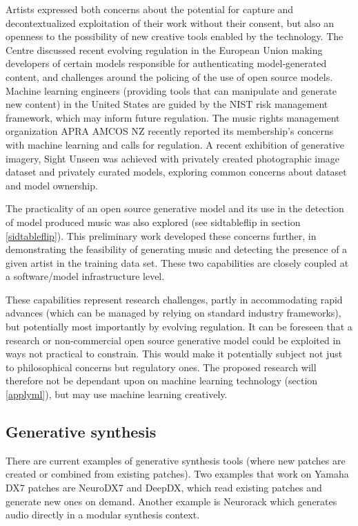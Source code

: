 \documentclass[10pt]{article}
\begin{document}
\begin{multicols*}{2}
Artists expressed both concerns about the potential for capture and decontextualized exploitation of their work without their consent\cite{datacollect}, but also an openness to the possibility of new creative tools enabled by the technology\cite{creativityai}. The Centre discussed recent evolving regulation in the European Union making developers of certain models responsible for authenticating model-generated content\cite{euairegs}, and challenges around the policing of the use of open source models. Machine learning engineers (providing tools that can manipulate and generate new content) in the United States are guided by the NIST risk management framework\cite{nistai}, which may inform future regulation. The music rights management organization APRA AMCOS NZ recently reported its membership's concerns with machine learning and calls for regulation\cite{aprastory}. A recent exhibition of generative imagery, Sight Unseen\cite{sightunseen} was achieved with privately created photographic image dataset and privately curated models, exploring common concerns about dataset and model ownership. 

The practicality of an open source generative model and its use in the detection of model produced music was also explored (see sidtableflip in section \ref{sidtableflip}). This preliminary work developed these concerns further, in demonstrating the feasibility of generating music and detecting the presence of a given artist in the training data set. These two capabilities are closely coupled at a software/model infrastructure level.

These capabilities represent research challenges, partly in accommodating rapid advances (which can be managed by relying on standard industry frameworks), but potentially most importantly by evolving regulation. It can be foreseen that a research or non-commercial open source generative model could be exploited in ways not practical to constrain. This would make it potentially subject not just to philosophical concerns but regulatory ones. The proposed research will therefore not be dependant upon on machine learning technology (section \ref{applyml}), but may use machine learning creatively.

\subsection{Generative synthesis}

There are current examples of generative synthesis tools (where new patches are created or combined from existing patches). Two examples that work on Yamaha DX7 patches are NeuroDX7\cite{neurodx7} and DeepDX\cite{deepdx}, which read existing patches and generate new ones on demand. Another example is Neurorack\cite{neurorack} which generates audio directly in a modular synthesis context.


\end{multicols*}
\end{document}
